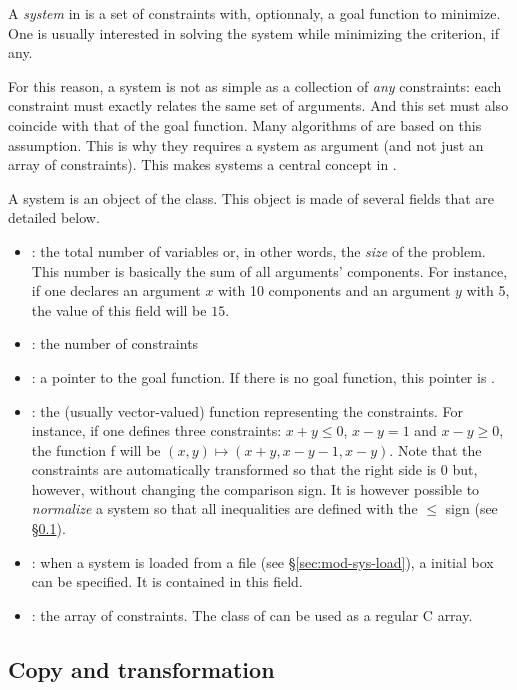 A {\it system} in \ibex is a set of constraints with, optionnaly, a goal function to minimize.
One is usually interested in solving the system while minimizing the criterion, if any.

For this reason, a system is not as simple as a collection of {\it any} constraints:
each constraint must exactly relates the same set of arguments. And this set must
also coincide with that of the goal function.
Many algorithms of \ibex are based on this assumption.
This is why they requires a system as argument (and not just an array of constraints).
This makes systems a central concept in \ibex.

A system is an object of the  class. This object is made of several fields
that are detailed below. %

\begin{itemize}
\item {} : the total number of variables or, in other words, the
{\it size} of the problem. This number is basically the sum of all arguments' components. For instance,
if one declares an argument $x$ with 10 components and an argument $y$ with 5, the value of this field
will be $15$.
\item {} : the number of constraints
\item {} : a pointer to the goal function. If there is no goal function, this
pointer is .
\item {} : the (usually vector-valued) function representing the constraints. 
For instance, if one defines three constraints: $x+y\leq0$, $x-y=1$ and $x-y\geq0$, the function f will be 
$(x,y)\mapsto (x+y,x-y-1,x-y)$. Note that the constraints are automatically transformed so that the right side 
is 0 but, however, without changing the comparison sign. It is however possible to {\it normalize} a system so that
all inequalities are defined with the $\le$ sign (see \S\ref{sec:mod-sys-transfo}).
\item {} : when a system is loaded from a file (see \S\ref{sec:mod-sys-load}),
a initial box can be specified. It is contained in this field.
\item {} : the array of constraints. The  class of \ibex can
be used as a regular C array.
\end{itemize}

\subsection{Copy and transformation}\label{sec:mod-sys-transfo}

